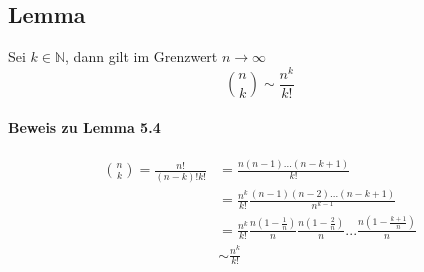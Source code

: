 \documentclass[12pt,a4paper]{article}
\begin{document}
 	\subsection{Lemma}
 	Sei $k\in\mathbb{N}$, dann gilt im Grenzwert $n\to\infty$
 	$$\binom{n}{k}\sim \frac{n^k}{k!}$$
 	
 	\paragraph{Beweis zu Lemma 5.4}
 	\begin{equation*}
 	\begin{split}
 	\binom{n}{k} = \frac{n!}{(n-k)!k!} & = \frac{n(n-1)...(n-k+1)}{k!}\\
 	& = \frac{n^k}{k!}\frac{(n-1)(n-2)...(n-k+1)}{n^{k-1}}\\
 	& = \frac{n^k}{k!}\frac{n\left(1-\frac{1}{n}\right)}{n} \frac{n\left(1-\frac{2}{n}\right)}{n} ... \frac{n\left(1-\frac{k+1}{n}\right)}{n}\\
 	& \sim \frac{n^k}{k!}
 	\end{split}
 	\end{equation*}
 	
 	
 	
 	
 	
 	
 	
 	
 	
 	
 	
 	
 	
 	
 	
 	
 	
 	
 	
 	
 	
 	
 	
 	
 	
 	
\end{document}
